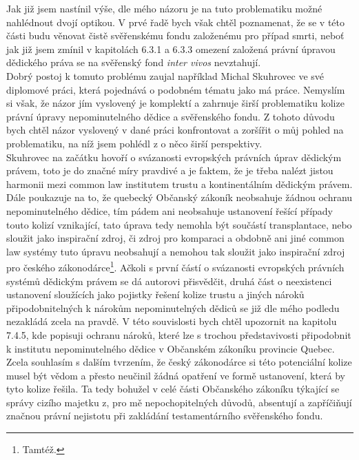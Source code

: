 \documentclass{article}
\begin{document}
Jak již jsem nastínil výše, dle mého názoru je na tuto problematiku možné nahlédnout dvojí optikou. V prvé řadě bych však chtěl poznamenat, že se v této části budu věnovat čistě svěřenskému fondu založenému pro případ smrti, neboť jak již jsem zmínil v kapitolách 6.3.1 a 6.3.3 omezení založená právní úpravou dědického práva se na svěřenský fond \textit{inter vivos} nevztahují.\\

Dobrý postoj k tomuto problému zaujal například Michal Skuhrovec ve své diplomové práci, která pojednává o podobném tématu jako má práce. Nemyslím si však, že názor jím vyslovený je komplektí a zahrnuje širší problematiku kolize právní úpravy nepominutelného dědice a svěřenského fondu. Z tohoto důvodu bych chtěl názor vyslovený v dané práci konfrontovat a zoršířit o můj pohled na problematiku, na níž jsem pohlédl z o něco širší perspektivy.\\

Skuhrovec na začátku hovoří o svázanosti evropských právních úprav dědickým právem, toto je do značné míry pravdivé a je faktem, že je třeba nalézt jistou harmonii mezi common law institutem trustu a kontinentálním dědickým právem. Dále poukazuje na to, že quebecký Občanský zákoník neobsahuje žádnou ochranu nepominutelného dědice, tím pádem ani neobsahuje ustanovení řešící případy touto kolizí vznikající, tato úprava tedy nemohla být součástí transplantace, nebo sloužit jako inspirační zdroj, či zdroj pro komparaci a obdobně ani jiné common law systémy tuto úpravu neobsahují a nemohou tak sloužit jako inspirační zdroj pro českého zákonodárce\footnote{Tamtéž.}. Ačkoli s první částí o svázanosti evropských právních systémů dědickým právem se dá autorovi přisvědčit, druhá část o neexistenci ustanovení sloužících jako pojistky řešení kolize trustu a jiných nároků připodobnitelných k nárokům nepominutelných dědiců se již dle mého podledu nezakládá zcela na pravdě. V této souvislosti bych chtěl upozornit na kapitolu 7.4.5, kde popisuji ochranu nároků, které lze s trochou představivosti připodobnit k institutu nepominutelného dědice v Občanském zákoníku provincie Quebec.\\

Zcela souhlasím s dalším tvrzením, že český zákonodárce si této potenciální kolize musel být vědom a přesto neučinil žádná opatření ve formě ustanovení, která by tyto kolize řešila. Ta tedy bohužel v celé části Občanského zákoníku týkající se správy cizího majetku z, pro mě nepochopitelných důvodů, absentují a zapříčiňují značnou právní nejistotu při zakládání testamentárního svěřenského fondu.\\
\end{document}
